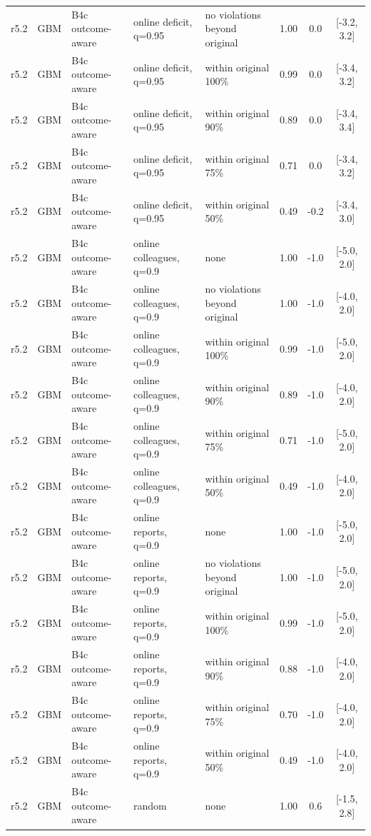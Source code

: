 \begin{longtable}{lllp{4.2cm}p{3.4cm}ccc}
r5.2 & GBM & B4c outcome-aware & online deficit, q=0.95 & no violations beyond original & 1.00 & 0.0 & [-3.2, 3.2] \\
r5.2 & GBM & B4c outcome-aware & online deficit, q=0.95 & within original 100\% & 0.99 & 0.0 & [-3.4, 3.2] \\
r5.2 & GBM & B4c outcome-aware & online deficit, q=0.95 & within original 90\% & 0.89 & 0.0 & [-3.4, 3.4] \\
r5.2 & GBM & B4c outcome-aware & online deficit, q=0.95 & within original 75\% & 0.71 & 0.0 & [-3.4, 3.2] \\
r5.2 & GBM & B4c outcome-aware & online deficit, q=0.95 & within original 50\% & 0.49 & -0.2 & [-3.4, 3.0] \\
r5.2 & GBM & B4c outcome-aware & online colleagues, q=0.9 & none & 1.00 & -1.0 & [-5.0, 2.0] \\
r5.2 & GBM & B4c outcome-aware & online colleagues, q=0.9 & no violations beyond original & 1.00 & -1.0 & [-4.0, 2.0] \\
r5.2 & GBM & B4c outcome-aware & online colleagues, q=0.9 & within original 100\% & 0.99 & -1.0 & [-5.0, 2.0] \\
r5.2 & GBM & B4c outcome-aware & online colleagues, q=0.9 & within original 90\% & 0.89 & -1.0 & [-4.0, 2.0] \\
r5.2 & GBM & B4c outcome-aware & online colleagues, q=0.9 & within original 75\% & 0.71 & -1.0 & [-5.0, 2.0] \\
r5.2 & GBM & B4c outcome-aware & online colleagues, q=0.9 & within original 50\% & 0.49 & -1.0 & [-4.0, 2.0] \\
r5.2 & GBM & B4c outcome-aware & online reports, q=0.9 & none & 1.00 & -1.0 & [-5.0, 2.0] \\
r5.2 & GBM & B4c outcome-aware & online reports, q=0.9 & no violations beyond original & 1.00 & -1.0 & [-5.0, 2.0] \\
r5.2 & GBM & B4c outcome-aware & online reports, q=0.9 & within original 100\% & 0.99 & -1.0 & [-5.0, 2.0] \\
r5.2 & GBM & B4c outcome-aware & online reports, q=0.9 & within original 90\% & 0.88 & -1.0 & [-4.0, 2.0] \\
r5.2 & GBM & B4c outcome-aware & online reports, q=0.9 & within original 75\% & 0.70 & -1.0 & [-4.0, 2.0] \\
r5.2 & GBM & B4c outcome-aware & online reports, q=0.9 & within original 50\% & 0.49 & -1.0 & [-4.0, 2.0] \\
r5.2 & GBM & B4c outcome-aware & random & none & 1.00 & 0.6 & [-1.5, 2.8] \\

\end{longtable}
